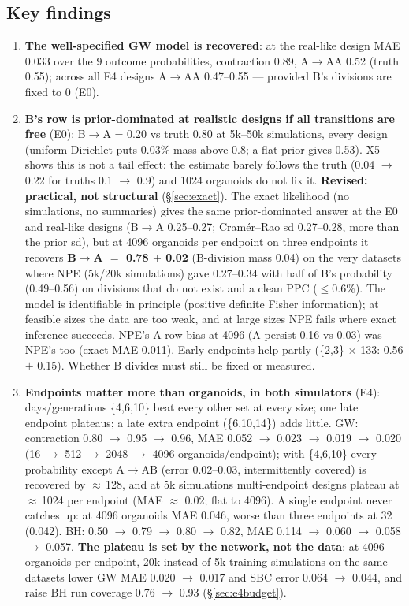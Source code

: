 \documentclass[10pt,a4paper]{article}
\begin{document}
\subsection*{Key findings}
\begin{enumerate}[leftmargin=1.4em]
\item \textbf{The well-specified GW model is recovered}: at the real-like design MAE 0.033 over the 9 outcome probabilities, contraction 0.89, A$\to$AA 0.52 (truth 0.55); across all E4 designs A$\to$AA 0.47--0.55 --- provided B's divisions are fixed to 0 (E0).
\item \textbf{B's row is prior-dominated at realistic designs if all transitions are free} (E0): B$\to$A = 0.20 vs truth 0.80 at 5k--50k simulations, every design (uniform Dirichlet puts 0.03\% mass above 0.8; a flat prior gives 0.53). X5 shows this is not a tail effect: the estimate barely follows the truth (0.04 $\to$ 0.22 for truths 0.1 $\to$ 0.9) and 1024 organoids do not fix it. \textbf{Revised: practical, not structural} (\S\ref{sec:exact}). The exact likelihood (no simulations, no summaries) gives the same prior-dominated answer at the E0 and real-like designs (B$\to$A 0.25--0.27; Cram\'er--Rao sd 0.27--0.28, more than the prior sd), but at 4096 organoids per endpoint on three endpoints it recovers \textbf{B$\to$A $=$ 0.78 $\pm$ 0.02} (B-division mass 0.04) on the very datasets where NPE (5k/20k simulations) gave 0.27--0.34 with half of B's probability (0.49--0.56) on divisions that do not exist and a clean PPC ($\le 0.6\%$). The model is identifiable in principle (positive definite Fisher information); at feasible sizes the data are too weak, and at large sizes NPE fails where exact inference succeeds. NPE's A-row bias at 4096 (A persist 0.16 vs 0.03) was NPE's too (exact MAE 0.011). Early endpoints help partly (\{2,3\} $\times$ 133: 0.56 $\pm$ 0.15). Whether B divides must still be fixed or measured.
\item \textbf{Endpoints matter more than organoids, in both simulators} (E4): days/generations \{4,6,10\} beat every other set at every size; one late endpoint plateaus; a late extra endpoint (\{6,10,14\}) adds little. GW: contraction 0.80 $\to$ 0.95 $\to$ 0.96, MAE 0.052 $\to$ 0.023 $\to$ 0.019 $\to$ 0.020 (16 $\to$ 512 $\to$ 2048 $\to$ 4096 organoids/endpoint); with \{4,6,10\} every probability except A$\to$AB (error 0.02--0.03, intermittently covered) is recovered by $\approx$\,128, and at 5k simulations multi-endpoint designs plateau at $\approx$\,1024 per endpoint (MAE $\approx$ 0.02; flat to 4096). A single endpoint never catches up: at 4096 organoids MAE 0.046, worse than three endpoints at 32 (0.042). BH: 0.50 $\to$ 0.79 $\to$ 0.80 $\to$ 0.82, MAE 0.114 $\to$ 0.060 $\to$ 0.058 $\to$ 0.057. \textbf{The plateau is set by the network, not the data}: at 4096 organoids per endpoint, 20k instead of 5k training simulations on the same datasets lower GW MAE 0.020 $\to$ 0.017 and SBC error 0.064 $\to$ 0.044, and raise BH run coverage 0.76 $\to$ 0.93 (\S\ref{sec:e4budget}).

\end{enumerate}
\end{document}
